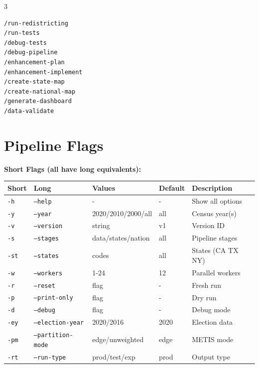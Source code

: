 \documentclass[10pt,landscape]{article}
\begin{document}
\begin{multicols}{3}
\begin{Verbatim}[fontsize=\small,frame=single]
/run-redistricting
/run-tests
/debug-tests
/debug-pipeline
/enhancement-plan
/enhancement-implement
/create-state-map
/create-national-map
/generate-dashboard
/data-validate
\end{Verbatim}

\columnbreak

\section*{Pipeline Flags}

\textbf{Short Flags (all have long equivalents):}

\vspace{2pt}

\begin{small}
\begin{tabular}{|l|l|p{3cm}|l|p{3cm}|}
\hline
\textbf{Short} & \textbf{Long} & \textbf{Values} & \textbf{Default} & \textbf{Description} \\
\hline
\texttt{-h} & \texttt{--help} & - & - & Show all options \\
\texttt{-y} & \texttt{--year} & 2020/2010/2000/all & all & Census year(s) \\
\texttt{-v} & \texttt{--version} & string & v1 & Version ID \\
\texttt{-s} & \texttt{--stages} & data/states/nation & all & Pipeline stages \\
\texttt{-st} & \texttt{--states} & codes & all & States (CA TX NY) \\
\texttt{-w} & \texttt{--workers} & 1-24 & 12 & Parallel workers \\
\texttt{-r} & \texttt{--reset} & flag & - & Fresh run \\
\texttt{-p} & \texttt{--print-only} & flag & - & Dry run \\
\texttt{-d} & \texttt{--debug} & flag & - & Debug mode \\
\texttt{-ey} & \texttt{--election-year} & 2020/2016 & 2020 & Election data \\
\texttt{-pm} & \texttt{--partition-mode} & edge/unweighted & edge & METIS mode \\
\texttt{-rt} & \texttt{--run-type} & prod/test/exp & prod & Output type \\
\hline
\end{tabular}
\end{small}

\vspace{4pt}


\end{multicols}
\end{document}
